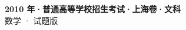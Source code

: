 \documentclass[zihao=-4, a4paper]{ctexart}
\begin{document}
\begin{center}
  {\Large\bfseries 2010 年·普通高等学校招生考试·上海卷·文科}\\[4pt]
  {\large 数学 · 试题版}
\end{center}
\medskip
{}

\end{document}
